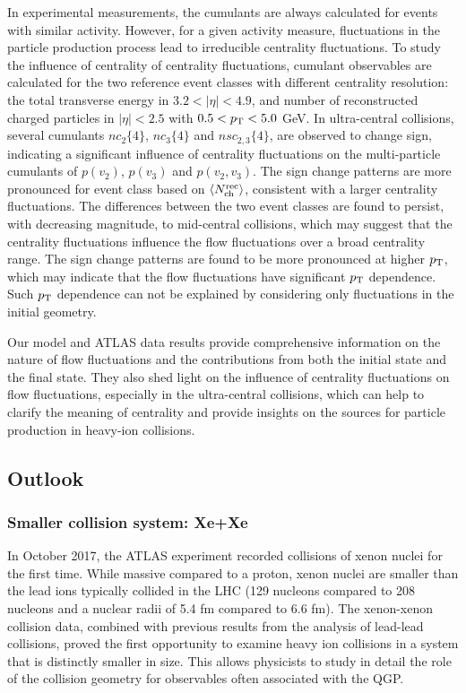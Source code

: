 In experimental measurements, the cumulants are always calculated for events with similar activity. However, for a given activity measure, fluctuations in the particle production process lead to irreducible centrality fluctuations. To study the influence of centrality of centrality fluctuations, cumulant observables are calculated for the two reference event classes with different centrality resolution: the total transverse energy in $3.2<|\eta|<4.9$, and number of reconstructed charged particles in $|\eta|<2.5$ with $0.5<p_\text{T}<5.0$ GeV. In ultra-central collisions, several cumulants $nc_2\{4\}$, $nc_3\{4\}$ and $nsc_{2,3}\{4\}$, are observed to change sign, indicating a significant influence of centrality fluctuations on the multi-particle cumulants of $p(v_2)$, $p(v_3)$ and $p(v_2, v_3)$. The sign change patterns are more pronounced for event class based on $\left\langle N_\text{ch}^\text{rec}\right\rangle$, consistent with a larger centrality fluctuations. The differences between the two event classes are found to persist, with decreasing magnitude, to mid-central collisions, which may suggest that the centrality fluctuations influence the flow fluctuations over a broad centrality range. The sign change patterns are found to be more pronounced at higher $p_\text{T}$, which may indicate that the flow fluctuations have significant $p_\text{T}$ dependence. Such $p_\text{T}$ dependence can not be explained by considering only fluctuations in the initial geometry.

Our model and ATLAS data results provide comprehensive information on the nature of flow fluctuations and the contributions from both the initial state and the final state. They also shed light on the influence of centrality fluctuations on flow fluctuations, especially in the ultra-central collisions, which can help to clarify the meaning of centrality and provide insights on the sources for particle production in heavy-ion collisions.



\subsection{Outlook}

\subsubsection{Smaller collision system: Xe+Xe}
\label{sec:novel_collision_systems_xexe}

In October 2017, the ATLAS experiment recorded collisions of xenon nuclei for the first time. While massive compared to a proton, xenon nuclei are smaller than the lead ions typically collided in the LHC (129 nucleons compared to 208 nucleons and a nuclear radii of 5.4 fm compared to 6.6 fm). The xenon-xenon collision data, combined with previous results from the analysis of lead-lead collisions, proved the first opportunity to examine heavy ion collisions in a system that is distinctly smaller in size. This allows physicists to study in detail the role of the collision geometry for observables often associated with the QGP.

